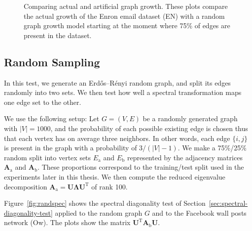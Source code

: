 \documentclass[11pt,a4paper]{book}
\begin{document}
\begin{figure}[h!]
{  }
  \caption{
    Comparing actual and artificial graph growth.  These plots compare
    the actual growth of the Enron email dataset (\textsf{EN}) with a
    random graph growth model starting at the moment where 75\% of edges
    are present in the dataset. 
  }
  \label{fig:random}
\end{figure}

\subsection{Random Sampling}
In this test, we generate an Erdős--Rényi random graph, and split its
edges randomly into two sets.  We then test how well a spectral
transformation maps one edge set to the other. 

We use the following setup:  Let $G=(V,E)$ be a randomly generated graph
with $|V|=1000$, and the probability of each possible existing edge is chosen
thus that each vertex has on average three neighbors.  
In other words, each edge $\{i,j\}$ is present in the graph with a
probability of $3/(|V|-1)$. 
We make a 75\%/25\% random split into vertex sets $E_{\mathrm a}$ and
$E_{\mathrm b}$ represented by 
the adjacency matrices $\mathbf A_{\mathrm a}$ and $\mathbf A_{\mathrm b}$.
These proportions 
correspond to the training/test split used in the experiments later in this
thesis.  We then compute the reduced eigenvalue decomposition $\mathbf
A_{\mathrm a}=\mathbf U\mathbf \Lambda\mathbf U^{\mathrm T}$
of rank 100. 

Figure~\ref{fig:randspec} shows the spectral diagonality test of
Section~\ref{sec:spectral-diagonality-test} applied to the random graph
$G$ and to the Facebook wall posts network (\textsf{Ow}).  The plots
show the matrix $\mathbf U^{\mathrm T}\mathbf A_{\mathrm b}\mathbf U$. 
\end{document}
